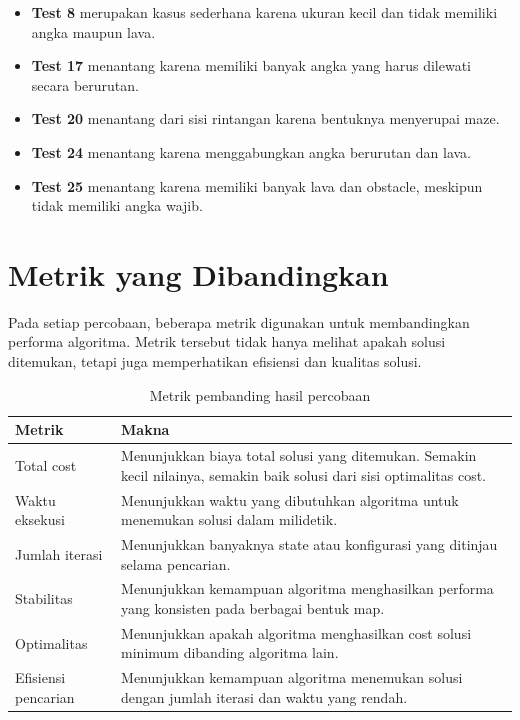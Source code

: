 \begin{tcolorbox}[
	colback=gray!5,
	colframe=black!60,
	title=\textbf{Klasifikasi Tingkat Kesulitan Test Case},
	arc=2mm,
	boxrule=0.8pt
]
\begin{itemize}
	\item \textbf{Test 8} merupakan kasus sederhana karena ukuran kecil dan tidak memiliki angka maupun lava.
	\item \textbf{Test 17} menantang karena memiliki banyak angka yang harus dilewati secara berurutan.
	\item \textbf{Test 20} menantang dari sisi rintangan karena bentuknya menyerupai maze.
	\item \textbf{Test 24} menantang karena menggabungkan angka berurutan dan lava.
	\item \textbf{Test 25} menantang karena memiliki banyak lava dan obstacle, meskipun tidak memiliki angka wajib.
\end{itemize}
\end{tcolorbox}


\section{Metrik yang Dibandingkan}

Pada setiap percobaan, beberapa metrik digunakan untuk membandingkan performa algoritma. 
Metrik tersebut tidak hanya melihat apakah solusi ditemukan, tetapi juga memperhatikan efisiensi dan kualitas solusi.

\begin{table}[H]
	\centering
	\caption{Metrik pembanding hasil percobaan}
	\begin{tabular}{|p{4cm}|p{10cm}|}
		\hline
		\rowcolor{gray!20}
		\textbf{Metrik} & \textbf{Makna} \\
		\hline
		Total cost & Menunjukkan biaya total solusi yang ditemukan. Semakin kecil nilainya, semakin baik solusi dari sisi optimalitas cost. \\
		\hline
		Waktu eksekusi & Menunjukkan waktu yang dibutuhkan algoritma untuk menemukan solusi dalam milidetik. \\
		\hline
		Jumlah iterasi & Menunjukkan banyaknya state atau konfigurasi yang ditinjau selama pencarian. \\
		\hline
		Stabilitas & Menunjukkan kemampuan algoritma menghasilkan performa yang konsisten pada berbagai bentuk map. \\
		\hline
		Optimalitas & Menunjukkan apakah algoritma menghasilkan cost solusi minimum dibanding algoritma lain. \\
		\hline
		Efisiensi pencarian & Menunjukkan kemampuan algoritma menemukan solusi dengan jumlah iterasi dan waktu yang rendah. \\
		\hline
	\end{tabular}
\end{table}


